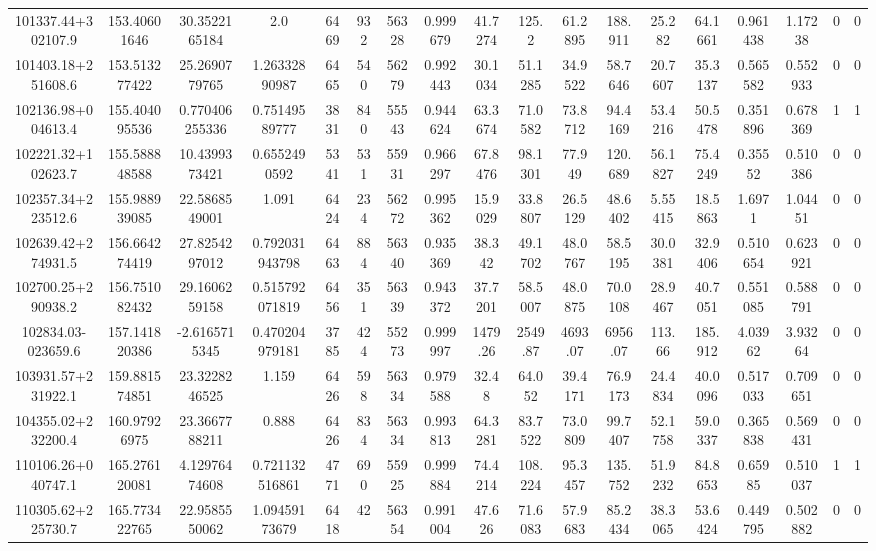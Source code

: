 \begin{table}
\begin{tabular}{cccccccccccccccccc}
101337.44+302107.9 & 153.40601646 & 30.3522165184 & 2.0 & 6469 & 932 & 56328 & 0.999679 & 41.7274 & 125.2 & 61.2895 & 188.911 & 25.282 & 64.1661 & 0.961438 & 1.17238 & 0 & 0 \\
101403.18+251608.6 & 153.513277422 & 25.2690779765 & 1.26332890987 & 6465 & 540 & 56279 & 0.992443 & 30.1034 & 51.1285 & 34.9522 & 58.7646 & 20.7607 & 35.3137 & 0.565582 & 0.552933 & 0 & 0 \\
102136.98+004613.4 & 155.404095536 & 0.770406255336 & 0.75149589777 & 3831 & 840 & 55543 & 0.944624 & 63.3674 & 71.0582 & 73.8712 & 94.4169 & 53.4216 & 50.5478 & 0.351896 & 0.678369 & 1 & 1 \\
102221.32+102623.7 & 155.588848588 & 10.4399373421 & 0.6552490592 & 5341 & 531 & 55931 & 0.966297 & 67.8476 & 98.1301 & 77.949 & 120.689 & 56.1827 & 75.4249 & 0.35552 & 0.510386 & 0 & 0 \\
102357.34+223512.6 & 155.988939085 & 22.5868549001 & 1.091 & 6424 & 234 & 56272 & 0.995362 & 15.9029 & 33.8807 & 26.5129 & 48.6402 & 5.55415 & 18.5863 & 1.6971 & 1.04451 & 0 & 0 \\
102639.42+274931.5 & 156.664274419 & 27.8254297012 & 0.792031943798 & 6463 & 884 & 56340 & 0.935369 & 38.342 & 49.1702 & 48.0767 & 58.5195 & 30.0381 & 32.9406 & 0.510654 & 0.623921 & 0 & 0 \\
102700.25+290938.2 & 156.751082432 & 29.1606259158 & 0.515792071819 & 6456 & 351 & 56339 & 0.943372 & 37.7201 & 58.5007 & 48.0875 & 70.0108 & 28.9467 & 40.7051 & 0.551085 & 0.588791 & 0 & 0 \\
102834.03-023659.6 & 157.141820386 & -2.6165715345 & 0.470204979181 & 3785 & 424 & 55273 & 0.999997 & 1479.26 & 2549.87 & 4693.07 & 6956.07 & 113.66 & 185.912 & 4.03962 & 3.93264 & 0 & 0 \\
103931.57+231922.1 & 159.881574851 & 23.3228246525 & 1.159 & 6426 & 598 & 56334 & 0.979588 & 32.48 & 64.052 & 39.4171 & 76.9173 & 24.4834 & 40.0096 & 0.517033 & 0.709651 & 0 & 0 \\
104355.02+232200.4 & 160.97926975 & 23.3667788211 & 0.888 & 6426 & 834 & 56334 & 0.993813 & 64.3281 & 83.7522 & 73.0809 & 99.7407 & 52.1758 & 59.0337 & 0.365838 & 0.569431 & 0 & 0 \\
110106.26+040747.1 & 165.276120081 & 4.12976474608 & 0.721132516861 & 4771 & 690 & 55925 & 0.999884 & 74.4214 & 108.224 & 95.3457 & 135.752 & 51.9232 & 84.8653 & 0.65985 & 0.510037 & 1 & 1 \\
110305.62+225730.7 & 165.773422765 & 22.9585550062 & 1.09459173679 & 6418 & 42 & 56354 & 0.991004 & 47.626 & 71.6083 & 57.9683 & 85.2434 & 38.3065 & 53.6424 & 0.449795 & 0.502882 & 0 & 0 \\

\end{tabular}
\end{table}
